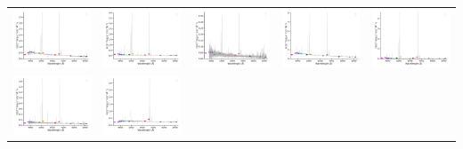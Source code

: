 \begin{center}
\begin{longtable}{l l l l l }
    \includegraphics[width=0.2\linewidth, clip]{Figs/Figs-sdss/spec-0334-51993-0065-SPLUS-n03s28-019988.pdf} & \includegraphics[width=0.2\linewidth, clip]{Figs/Figs-sdss/spec-0334-51993-0365-SPLUS-n02s27-030519.pdf} & \includegraphics[width=0.2\linewidth, clip]{Figs/Figs-sdss/spec-0334-51993-0443-SPLUS-n02s28-028453.pdf} & \includegraphics[width=0.2\linewidth, clip]{Figs/Figs-sdss/spec-0371-52078-0576-STRIPE82-0128-050321.pdf} & \includegraphics[width=0.2\linewidth, clip]{Figs/Figs-sdss/spec-0372-52173-0286-STRIPE82-0127-009047.pdf} \\
    \includegraphics[width=0.2\linewidth, clip]{Figs/Figs-sdss/spec-0372-52173-0296-SPLUS-s02s04-032140.pdf} & \includegraphics[width=0.2\linewidth, clip]{Figs/Figs-sdss/spec-0373-51788-0507-STRIPE82-0132-025641.pdf} \\
  \end{longtable}
\end{center}
